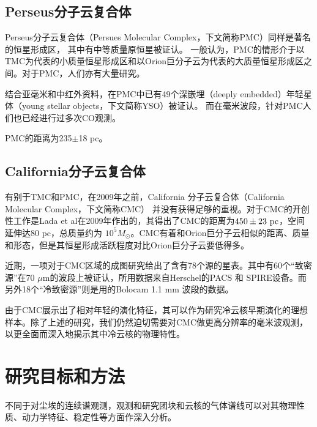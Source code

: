 \documentclass[UTF8]{pkuthss}
\begin{document}
		\subsection{Perseus分子云复合体}

			Perseus分子云复合体（Persues Molecular Complex，下文简称PMC）同样是著名的恒星形成区， 其中有中等质量原恒星被证认\supercite{2010A&A...512A..67L}。 一般认为，PMC的情形介于以TMC为代表的小质量恒星形成区和以Orion巨分子云为代表的大质量恒星形成区之间\supercite{2010ApJ...711..655J}。对于PMC，人们亦有大量研究。

			结合亚毫米和中红外资料，在PMC中已有49个深嵌埋（deeply embedded）年轻星体（young stellar objects，下文简称YSO）被证认\supercite{2007ApJ...656..293J}。 而在毫米波段，针对PMC人们也已经进行过多次CO观测\supercite{1979ApJ...233..163S,1999ApJ...525..318P, 2005A&A...440..151H}。

			PMC的距离为235$\pm$18 pc\supercite{2010A&A...512A..67L}。

		\subsection{California分子云复合体}

			有别于TMC和PMC，在2009年之前，California 分子云复合体（California Molecular Complex，下文简称CMC） 并没有获得足够的重视。对于CMC的开创性工作是Lada et al在2009年作出的，其得出了CMC的距离为$450\pm23\rm\ pc$，空间延伸达80 pc，总质量约为 $10^5 M_\odot$\supercite{2009ApJ...703...52L}。CMC有着和Orion巨分子云相似的距离、质量和形态，但是其恒星形成活跃程度对比Orion巨分子云要低得多\supercite{2009ApJ...703...52L,2010A&A...512A..67L}。

			近期，一项对于CMC区域的成图研究给出了含有78个源的星表\supercite{2013ApJ...764..133H}。其中有60个“致密源”在70 $\mu$m的波段上被证认，所用数据来自Herschel的PACS 和 SPIRE设备\supercite{2013ApJ...764..133H}。而另外18个“冷致密源”则是用的Bolocam 1.1 mm 波段的数据\supercite{2013ApJ...764..133H}。

			由于CMC展示出了相对年轻的演化特征，其可以作为研究冷云核早期演化的理想样本。除了上述的研究，我们仍然迫切需要对CMC做更高分辨率的毫米波观测，以更全面而深入地揭示其中冷云核的物理特性。

	\section{研究目标和方法}

		不同于对尘埃的连续谱观测，观测和研究团块和云核的气体谱线可以对其物理性质、动力学特征、稳定性等方面作深入分析。
\end{document}
